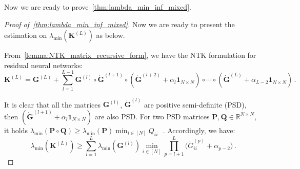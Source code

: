 \documentclass[nohyperref]{article}
\theoremstyle{plain}
\theoremstyle{definition}
\theoremstyle{remark}
\begin{document}
Now we are ready to prove~\cref{thm:lambda_min_inf_mixed}.

\begin{proof}[Proof of~\cref{thm:lambda_min_inf_mixed}]



Now we are ready to present the estimation on $\lambda _{\min}(\bm{K}^{(L)})$ as below.

From~\cref{lemma:NTK_matrix_recursive_form}, we have the NTK formulation for residual neural networks:
\begin{equation*}
    \bm{K}^{(L)}=\bm{G}^{(L)} + \sum_{l=1}^{L-1}\bm{G}^{(l)}\circ \dot{\bm{G}}^{(l+1)} \circ (\dot{\bm{G}}^{(l+2)}+  \alpha_{l}\bm{1}_{N \times N})\circ \cdots \circ (\dot{\bm{G}}^{(L)}+ \alpha_{L-2}\bm{1}_{N \times N})\,.
\end{equation*}


It is clear that all the matrices $\bm{G}^{(l)}$, $\dot{\bm{G}}^{(l)}$ are positive semi-definite (PSD), then $(\dot{\bm{G}}^{(l+1)}+  \alpha_{l}\bm{1}_{N \times N})$ are also PSD.
For two PSD matrices $\bm{P}, \bm{Q} \in \mathbb{R}^{N \times N}$, it holds $\lambda _{\min}(\bm{P} \circ \bm{Q})\geq \lambda _{\min}(\bm{P})\min_{i\in [N]}Q_{ii}$~\citep{Schur+1911+1+28}\,.
Accordingly, we have:
\begin{equation*}
\lambda _{\min}(\bm{K}^{(L)})\geq \sum_{l=1}^{L}\lambda _{\min}(\bm{G}^{(l)})\min_{i\in[N]}\prod_{p=l+1}^{L}\bigg(\dot{G}^{(p)}_{ii}+\alpha_{p-2}\bigg)\,.
\end{equation*}



\end{proof}
\end{document}
